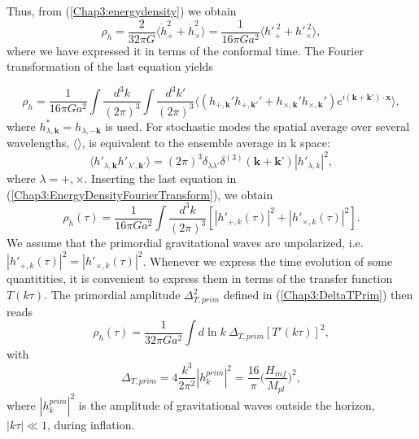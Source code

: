 \documentclass[11pt,a4paper,twoside]{book}
\begin{document}
Thus, from (\ref{Chap3:energydensity}) we obtain
\begin{equation}
	\label{Chap3:energydensity2}
	\rho_{h} = \frac{2}{32\pi G}\langle \dot{h}^{2}_{+} + \dot{h}^{2}_{\times}\rangle  = \frac{1}{16\pi G a^{2}}\langle h'^{\ 2}_{+} + h'^{\ 2}_{\times}\rangle   ,
\end{equation}
where we have expressed it in terms of the conformal time. The Fourier transformation of the last equation yields

\begin{equation}
\label{Chap3:EnergyDensityFourierTransform}
\rho_{h}=	\frac{1}{16\pi G a^{2}} \int \frac{d^{3}k}{(2\pi)^{3}}\int \frac{d^{3}k'}{(2\pi)^{3}} \langle (h_{+,\textbf{k}}'h_{+,\textbf{k}'}' + h_{\times,\textbf{k}}'h_{\times,\textbf{k}}')e^{i(\textbf{k} + \textbf{k}') \cdot \textbf{x}} \rangle  ,
\end{equation}
where $ h^{*}_{\lambda,\textbf{k}}=h_{\lambda,-\textbf{k}} $ is used. For stochastic modes the spatial average over several wavelengths, $ \langle  \rangle   $, is equivalent to the ensemble average in k space:
\begin{equation}
	\label{Chap3:ensembleAverage}
	\langle h'_{\lambda,\textbf{k}}h'_{\lambda',\textbf{k'}}\rangle  =(2\pi)^{3}\delta_{\lambda\lambda'}\delta^{(3)}(\textbf{k}+\textbf{k'})|h'_{\lambda,k}|^{2},
\end{equation}
where $\lambda = +,\times$. Inserting the last equation in (\ref{Chap3:EnergyDensityFourierTransform}), we obtain
\begin{equation}
	\rho_{h}(\tau)=\frac{1}{16\pi G a^{2}} \int \frac{d^{3} k}{(2\pi)^{3}}[|h'_{+,k}(\tau)|^{2} + |h'_{\times,k}(\tau)|^{2}].
\end{equation}
We assume that the primordial gravitational waves are unpolarized, i.e. $ |h'_{+,k}(\tau)|^{2} = |h'_{\times,k}(\tau)|^{2} $. Whenever we express the time evolution of some quantitities, it is convenient to express them in terms of the transfer function $T(k\tau)$.  The primordial amplitude $\Delta_{T,prim}^{2}$ defined in (\ref{Chap3:DeltaTPrim}) then reads
\begin{equation}
	\label{Chap3:EnergydensityTransferFunction}
	\rho_{h}(\tau)=\frac{1}{32\pi Ga^{2}}\int d\ln k\ \Delta_{T,prim}[T'(k\tau)]^{2},
\end{equation}
with 
\begin{equation}
	\label{Chap3:deltah2}
	\Delta_{T,prim}=4\frac{k^{3}}{2\pi^{2}}|h^{prim}_{k}|^{2}=\frac{16}{\pi}\Big(\frac{H_{inf}}{M_{pl}}\Big)^{2},
\end{equation}
where $|h^{prim}_{k}|^{2}  $ is the amplitude of gravitational waves outside the horizon, $ |k\tau| \ll 1 $, during inflation. 
\end{document}
